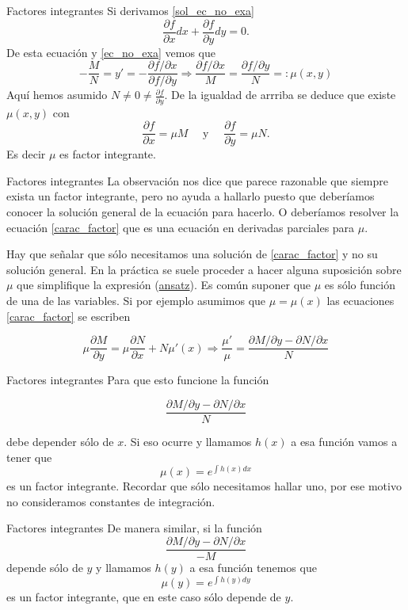 \documentclass[handout,hyperref={colorlinks=true}]{beamer}
\renewcommand{\emph}[1]{\textcolor[rgb]{1,0,0}{#1}}
\newcommand{\der}[2]{\frac{\partial #1}{\partial #2}}
\begin{document}
\begin{frame}{Factores integrantes}
Si derivamos \eqref{sol_ec_no_exa}
\[\der{f}{x}dx+\der{f}{y}dy=0.\]
De esta ecuación y \eqref{ec_no_exa} vemos que
\[-\frac{M}{N}=y'=-\frac{\partial f /\partial x}{\partial f/\partial y}\Longrightarrow \frac{ \partial f /\partial x}{M}=\frac{ \partial f/\partial y}{N}=:\mu(x,y)\]
Aquí hemos asumido $N\neq 0 \neq\der{f}{y}$. De la igualdad de arrriba se deduce que existe $\mu(x,y)$ con
\[\der{f}{x}=\mu M\quad\text{ y }\quad \der{f}{y}=\mu N.\]
Es decir $\mu$ es factor integrante.
\end{frame}

\begin{frame}{Factores integrantes}
La observación nos dice que parece razonable que siempre exista un factor integrante, pero no ayuda a hallarlo puesto que deberíamos conocer la solución general de la ecuación
para hacerlo. O deberíamos resolver la ecuación \eqref{carac_factor} que es una ecuación en derivadas parciales para $\mu$.

Hay que señalar que sólo necesitamos una solución de \eqref{carac_factor} y no su solución general. En la práctica se suele proceder a hacer alguna suposición
sobre $\mu$ que simplifique la expresión (\href{http://es.wikipedia.org/wiki/Ansatz}{ansatz}). Es común suponer que $\mu$ es sólo función de una de las variables. Si por ejemplo asumimos que $\mu=\mu(x)$ las ecuaciones 
\eqref{carac_factor} se escriben

\[\mu\der{M}{y}=\mu\der{N}{x}+N\mu'(x) \Longrightarrow\boxed{\frac{\mu'}{\mu}=\frac{\partial M/\partial y-\partial N/\partial x}{N}}\]
\end{frame}


\begin{frame}{Factores integrantes}
Para que esto funcione la función 

\[\frac{\partial M/\partial y-\partial N/\partial x}{N}\]

\emph{debe depender sólo de $x$}. Si eso ocurre y llamamos $h(x)$ a esa función vamos a tener que
\[\mu(x)=e^{\int h(x)dx}\]
es un factor integrante. Recordar que sólo necesitamos hallar uno, por ese motivo no consideramos constantes de integración. 
\end{frame}

\begin{frame}{Factores integrantes}
De manera similar, si la función
\[\frac{\partial M/\partial y-\partial N/\partial x}{-M}\]
depende sólo de $y$ y llamamos $h(y)$ a esa función tenemos que
\[\mu(y)=e^{\int h(y)dy}\]
es un factor integrante, que en este caso sólo depende de $y$.
\end{frame}
\end{document}
